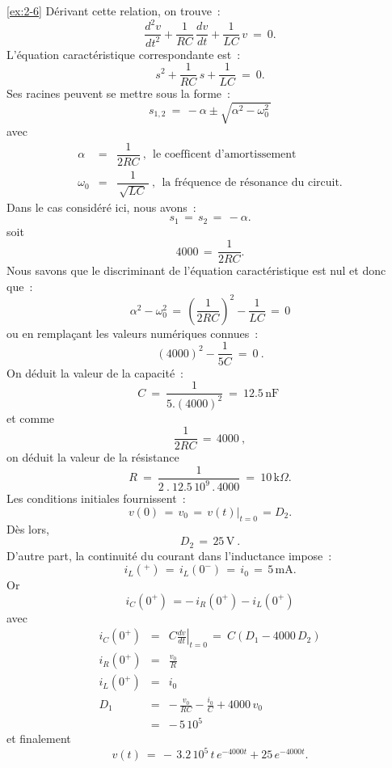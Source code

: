 \begin{solexercise}{\ref{ex:2-6}}
D\'erivant cette relation, on trouve~:
\[ \dfrac{d^2v}{dt^2} + \dfrac{1}{RC} \, \dfrac{dv}{dt} + \dfrac{1}{LC} \, v \: = \: 0. \]
L'\'equation caract\'eristique correspondante est~:
\[ s^2 + \dfrac{1}{RC} \, s + \dfrac{1}{LC} \: = \: 0. \]
Ses racines peuvent se mettre sous la forme~:
\[ s_{1,2} \: = \, -\alpha \pm \sqrt{\alpha^2 - \omega_0^2\,} \]
avec
\begin{eqnarray*}
	\alpha &=& \dfrac{1}{2RC}~, ~~\mbox{le coefficent d'amortissement}\\
	\omega_0 &=& \dfrac{1}{\, \sqrt{LC}\,}~, ~~\mbox{la fr\'equence de r\'esonance du circuit.}
\end{eqnarray*}
Dans le cas consid\'er\'e ici, nous avons~:
\[ s_1 \, =\,  s_2\, =\,  -\alpha. \]
soit
\[ 4000 \, =\,  \dfrac{1}{2RC}. \]
Nous savons que le discriminant de l'\'equation caract\'eristique est nul et donc que~:
\[ \alpha^2 - \omega_0^2 \, = \, \left( \dfrac{1}{2RC}\right)^2 - \dfrac{1}{LC} \, = \, 0 \]
ou en rempla\c{c}ant les valeurs num\'eriques connues~:
\[  (4000)^2 - \dfrac{1}{5C} \: = \: 0~. \]
On d\'eduit la valeur de la capacit\'e~:
\[ C \: = \: \dfrac{1}{5.(4000)^2} \: = \: 12.5\, \mbox{nF~} \]
et comme
\[ \dfrac{1}{2RC} \, = \, 4000~,\]
on d\'eduit la valeur de la r\'esistance
\[ R \: = \: \dfrac{1}{2\: . \: 12.5\, 10^9\, . \, 4000} \: = \: 10\,\mbox{k}\Omega. \]
Les conditions initiales fournissent~:
\[ v(0) \, = \, v_0 \, = \, \left. v(t)\right|_{t=0} \,=  D_2. \]
D\`es lors,
\[ D_2 \, = \, 25\, \mbox{V}~. \]
D'autre part, la continuit\'e du courant dans l'inductance impose~:
\[ i_L(^+) \, = \, i_L(0^-) \, = \, i_0 \, = \, 5\, \mbox{mA}.\]
Or
\[ i_C(0^+) \, = -\, i_R(0^+) - i_L(0^+) \]
avec
\begin{eqnarray*}
	i_C(0^+) &=& C \left. \frac{dv}{dt}\right|_{t=0} \, = \: C\left( D_1 - 4000\, D_2 \right)\\
	i_R(0^+) &=& \frac{v_0}{R}\\
	i_L(0^+) &=& i_0\\
	D_1 &=& -\, \frac{v_0}{RC} - \frac{i_0}{C} + 4000\, v_0\\
	&=& -\, 5\, 10^5
\end{eqnarray*}
et finalement
\[ v(t) \: = \, -\, 3.2\, 10^5\, t \, e^{-4000t} + 25\, e^{-4000t}. \]
\end{solexercise}

